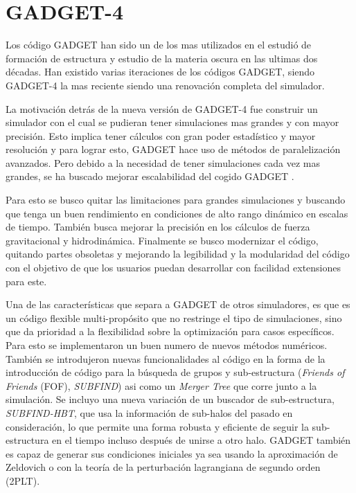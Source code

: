 \section{GADGET-4}

Los código GADGET han sido un de los mas utilizados en el estudió de formación de estructura y estudio de la materia oscura en las ultimas dos décadas. Han existido varias iteraciones de los códigos GADGET, siendo GADGET-4 la mas reciente siendo una renovación completa del simulador. 

La motivación detrás de la nueva versión de GADGET-4 fue construir un simulador con el cual se pudieran tener simulaciones mas grandes y con mayor precisión. Esto implica tener cálculos con gran poder estadístico y mayor resolución y para lograr esto, GADGET hace uso de métodos de paralelización avanzados. Pero debido a la necesidad de tener simulaciones cada vez mas grandes, se ha buscado mejorar escalabilidad del cogido GADGET \cite{2021MNRAS.506.2871S}.

Para esto se busco quitar las limitaciones para grandes simulaciones y buscando que tenga un buen rendimiento en condiciones de alto rango dinámico en escalas de tiempo. También busca mejorar la precisión en los cálculos de fuerza gravitacional y hidrodinámica. Finalmente se busco modernizar el código, quitando partes obsoletas y mejorando la legibilidad y la modularidad del código con el objetivo de que los usuarios puedan desarrollar con facilidad extensiones para este. 

 
Una de las características que separa a GADGET de otros simuladores, es que es un código flexible multi-propósito que no restringe el tipo de simulaciones, sino que da prioridad a la flexibilidad  sobre la optimización para casos específicos. Para esto se implementaron un buen numero de nuevos métodos numéricos. También se introdujeron nuevas funcionalidades al código en la forma de la introducción de código para la búsqueda de grupos y sub-estructura (\textit{Friends of Friends} (FOF), \textit{SUBFIND}) asi como un \textit{Merger Tree} que corre junto a la simulación. Se incluyo una nueva variación de un buscador de sub-estructura, \textit{SUBFIND-HBT}, que usa la información de sub-halos del pasado en consideración, lo que permite una forma robusta y eficiente de seguir la sub-estructura en el tiempo incluso después de unirse a otro halo. GADGET también es capaz de generar sus condiciones iniciales ya sea usando la aproximación de Zeldovich o con la teoría de la perturbación lagrangiana de segundo orden (2PLT)\cite{2021MNRAS.506.2871S}.


